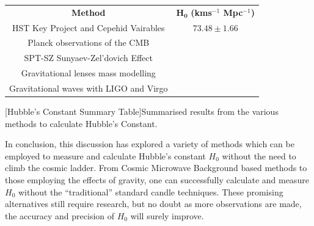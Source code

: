 \documentclass[12pt, onecolumn]{revtex4}    %
\begin{document}
\begin{center}
\begin{tabular}{c@{\hskip 20pt}c} 
 \hline
 \textbf{Method} & $\boldsymbol{H_0}$ \textbf{(kms$^{-1}$ Mpc$^{-1}$)} \\ [0.5ex] 
 HST Key Project and Cepehid Vairables & $73.48\pm1.66$ \\
 Planck observations of the CMB & \\
 SPT-SZ Sunyaev-Zel'dovich Effect & \\
 Gravitational lenses mass modelling & \\
 Gravitational waves with LIGO and Virgo & \\
 \hline
\end{tabular}
[Hubble's Constant Summary Table]{Summarised results from the various methods to calculate Hubble's Constant.}
\label{table:spectral_classification}
\end{center}

In conclusion, this discussion has explored a variety of methods which can be employed to measure and calculate Hubble's constant $H_0$ without the need to climb the cosmic ladder. From Cosmic Microwave Background based methods to those employing the effects of gravity, one can successfully calculate and measure $H_0$ without the ``traditional'' standard candle techniques. These promising alternatives still require research, but no doubt as more observations are made, the accuracy and precision of $H_0$ will surely improve. 

\newpage





\newpage
\end{document}

